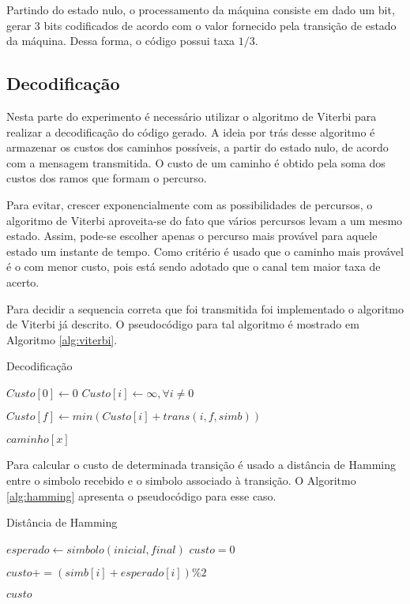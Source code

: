 Partindo do estado nulo, o processamento da máquina consiste em dado um bit, gerar 3 bits codificados de acordo com o valor fornecido pela transição de estado da máquina. Dessa forma, o código possui taxa $1/3$.


\subsection{Decodificação}

Nesta parte do experimento é necessário utilizar o algoritmo de Viterbi para realizar a decodificação do código gerado. A ideia por trás desse algoritmo é armazenar os custos dos caminhos possíveis, a partir do estado nulo, de acordo com a mensagem transmitida. O custo de um caminho é obtido pela soma dos custos dos ramos que formam o percurso.

Para evitar, crescer exponencialmente com as possibilidades de percursos, o algoritmo de Viterbi aproveita-se do fato que vários percursos levam a um mesmo estado. Assim, pode-se escolher apenas o percurso mais provável para aquele estado um instante de tempo. Como critério é usado que o caminho mais provável é o com menor custo, pois está sendo adotado que o canal tem maior taxa de acerto.

Para decidir a sequencia correta que foi transmitida foi implementado o algoritmo de Viterbi já descrito. O pseudocódigo para tal algoritmo é mostrado em Algoritmo \ref{alg:viterbi}.

\begin{algorithm}[h!]
	\caption{Decodificação}
	\label{alg:viterbi}
	\begin{algorithmic}		
			\State $Custo[0] \gets 0$
			\State $Custo[i] \gets \infty, \forall i \ne 0$
			
					\State $Custo[f] \gets min(Custo[i] + trans(i, f, simb))$
				\EndFor
			\EndFor
			
			
		\Return $caminho[x]$
		\EndProcedure
	\end{algorithmic}
\end{algorithm}

Para calcular o custo de determinada transição é usado a distância de Hamming entre o simbolo recebido e o simbolo associado à transição. O Algoritmo \ref{alg:hamming} apresenta o pseudocódigo para esse caso.

\begin{algorithm}[h!]
	\caption{Distância de Hamming}
	\label{alg:hamming}
	\begin{algorithmic}		
		\State $esperado \gets simbolo(inicial, final)$
		\State $custo = 0$
		
			\State $custo += (simb[i] + esperado[i]) \% 2$
		\EndFor
		
		\Return $custo$
		\EndProcedure
	\end{algorithmic}
\end{algorithm}

